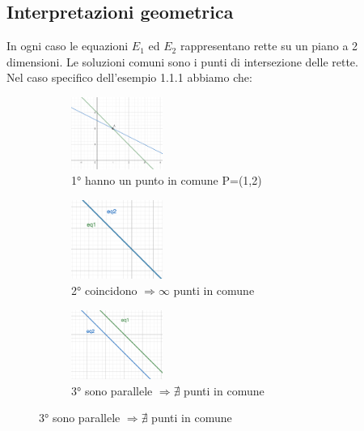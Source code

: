 \subsection{Interpretazioni geometrica}
In ogni caso le equazioni $E_1$ ed $E_2$ rappresentano rette su un piano a 2 dimensioni. Le soluzioni comuni sono i punti di intersezione delle rette. \\Nel caso specifico dell'esempio 1.1.1 abbiamo che:
\begin{figure}[h!]
    \centering
    \begin{subfigure}{.3\textwidth}
        \centering
        \includegraphics[width=3cm]{images/rette-incidenti.png}
        \caption{1° hanno un punto in comune P=(1,2)}
    \end{subfigure}
    \hfill
    \begin{subfigure}{.3\textwidth}
        \centering
        \includegraphics[width=3cm]{images/rette-coincidenti.png}
        \caption{2° coincidono $\Rightarrow \infty$ punti in comune}
    \end{subfigure}
    \hfill
    \begin{subfigure}{.3\textwidth}
        \centering
        \includegraphics[width=3cm]{images/rette-parallele.png}
        \caption{3° sono parallele  $\Rightarrow \nexists$ punti in comune}
    \end{subfigure}
\end{figure}
\newpage
